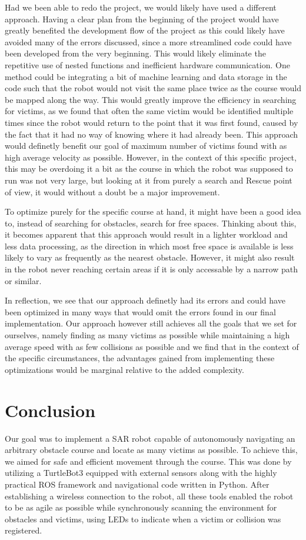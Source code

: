 \documentclass[conference]{IEEEtran}
\begin{document}
Had we been able to redo the project, we would likely have used a different approach.
Having a clear plan from the beginning of the project would have greatly benefited the development flow of the project as this could likely have avoided many of the errors discussed, since a more streamlined code could have been developed from the very beginning.
This would likely eliminate the repetitive use of nested functions and inefficient hardware communication.
One method could be integrating a bit of machine learning and data storage in the code such that the robot would not visit the same place twice as the course would be mapped along the way. This would greatly improve the efficiency in searching for victims, as we found that often the same victim would be identified multiple times since the robot would return to the point that it was first found, caused by the fact that it had no way of knowing where it had already been.
This approach would definetly benefit our goal of maximum  number of victims found with as high average velocity as possible.
However, in the context of this specific project, this may be overdoing it a bit as the course in which the robot was supposed to run was not very large, but looking at it from purely a search and Rescue point of view, it would without a doubt be a major improvement.

To optimize purely for the specific course at hand, it might have been a good idea to, instead of searching for obstacles, search for free spaces.
Thinking about this, it becomes apparent that this approach would result in a lighter workload and less data processing, as the direction in which most free space is available is less likely to vary as frequently as the nearest obstacle.
However, it might also result in the robot never reaching certain areas if it is only accessable by a narrow path or similar.

In reflection, we see that our approach definetly had its errors and could have been optimized in many ways that would omit the errors found in our final implementation.
Our approach however still achieves all the goals that we set for ourselves, namely finding as many victims as possible while maintaining a high average speed with as few collisions as possible and we find that in the context of the specific circumstances, the advantages gained from implementing these optimizations would be marginal relative to the added complexity.

\section{Conclusion}
Our goal was to implement a SAR robot capable of autonomously navigating an arbitrary obstacle course and locate as many victims as possible.
To achieve this, we aimed for safe and efficient movement through the course.
This was done by utilizing a TurtleBot3 equipped with external sensors along with the highly practical ROS framework and navigational code written in Python.
After establishing a wireless connection to the robot, all these tools enabled the robot to be as agile as possible while synchronously scanning the environment for obstacles and victims, using LEDs to indicate when a victim or collision was registered.
\end{document}

